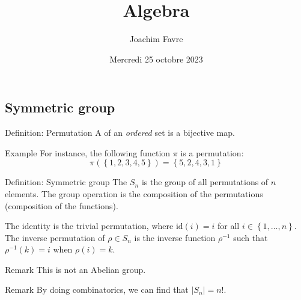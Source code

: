 \documentclass[a4paper]{article}
\title{Algebra}
\author{Joachim Favre}
\date{Mercredi 25 octobre 2023}
\begin{document}
\maketitle


\subsection{Symmetric group}

\begin{parag}{Definition: Permutation}
    A  of an \textit{ordered} set is a bijective map.

    \begin{subparag}{Example}
        For instance, the following function $\pi$ is a permutation: 
        \[\pi\left(\left\{1,2,3,4,5\right\}\right) = \left\{5,2,4,3,1\right\}\]
        
    \end{subparag}
    
\end{parag}


\begin{parag}{Definition: Symmetric group}
    The  $S_n$ is the group of all permutations of $n$ elements. The group operation is the composition of the permutations (composition of the functions).

    The identity is the trivial permutation, where $\text{id}\left(i\right) = i$ for all $i \in \left\{1, \ldots, n\right\}$. The inverse permutation of $\rho \in S_n$ is the inverse function $\rho^{-1}$ such that $\rho^{-1}\left(k\right) = i$ when $\rho\left(i\right) = k$.

    \begin{subparag}{Remark}
        This is not an Abelian group.
    \end{subparag}

    \begin{subparag}{Remark}
        By doing combinatorics, we can find that $\left|S_n\right| = n!$.
    \end{subparag}
\end{parag}
\end{document}
